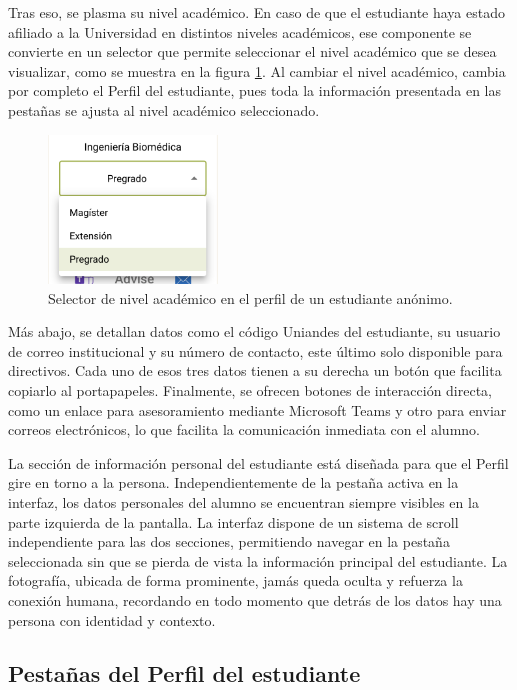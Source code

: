 Tras eso, se plasma su nivel académico. En caso de que el estudiante haya estado afiliado a la Universidad en distintos niveles académicos, ese componente se convierte en un selector que permite seleccionar el nivel académico que se desea visualizar, como se muestra en la figura \ref{fix:selector}. Al cambiar el nivel académico, cambia por completo el Perfil del estudiante, pues toda la información presentada en las pestañas se ajusta al nivel académico seleccionado.

\begin{figure}[H]
  \centering
  \includegraphics[width=0.4\textwidth]{img/nes/selector.png}
  \caption{Selector de nivel académico en el perfil de un estudiante anónimo.}
  \label{fix:selector}
\end{figure}

Más abajo, se detallan datos como el código Uniandes del estudiante, su usuario de correo institucional y su número de contacto, este último solo disponible para directivos. Cada uno de esos tres datos tienen a su derecha un botón que facilita copiarlo al portapapeles. Finalmente, se ofrecen botones de interacción directa, como un enlace para asesoramiento mediante Microsoft Teams y otro para enviar correos electrónicos, lo que facilita la comunicación inmediata con el alumno. 

La sección de información personal del estudiante está diseñada para que el Perfil gire en torno a la persona. Independientemente de la pestaña activa en la interfaz, los datos personales del alumno se encuentran siempre visibles en la parte izquierda de la pantalla. La interfaz dispone de un sistema de scroll independiente para las dos secciones, permitiendo navegar en la pestaña seleccionada sin que se pierda de vista la información principal del estudiante. La fotografía, ubicada de forma prominente, jamás queda oculta y refuerza la conexión humana, recordando en todo momento que detrás de los datos hay una persona con identidad y contexto.

\subsection{Pestañas del Perfil del estudiante}

